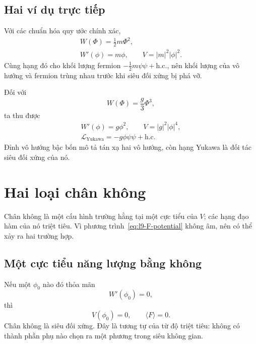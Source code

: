 \subsection{Hai ví dụ trực tiếp}

Với các chuẩn hóa quy ước chính xác,
\begin{equation}
\begin{gathered}
W(\Phi)=\frac12m\Phi^2,\\
W'(\phi)=m\phi,
\qquad V=|m|^2|\phi|^2.
\end{gathered}
\label{eq:l9-quadratic-W}
\end{equation}
Cùng hạng đó cho khối lượng fermion \(-\tfrac12m\psi\psi+\mathrm{h.c.}\), nên khối lượng của vô hướng và fermion trùng nhau trước khi siêu đối xứng bị phá vỡ.

Đối với
\begin{equation}
W(\Phi)=\frac{g}{3}\Phi^3,
\end{equation}
ta thu được
\begin{equation}
\begin{gathered}
W'(\phi)=g\phi^2,
\qquad V=|g|^2|\phi|^4,\\
\mathcal L_{\mathrm{Yukawa}}
=-g\phi\psi\psi+\mathrm{h.c.}
\end{gathered}
\label{eq:l9-cubic-W}
\end{equation}
Đỉnh vô hướng bậc bốn mô tả tán xạ hai vô hướng, còn hạng Yukawa là đối tác siêu đối xứng của nó.

\section{Hai loại chân không}

Chân không là một cấu hình trường hằng tại một cực tiểu của \(V\); các hạng đạo hàm của nó triệt tiêu. Vì phương trình~\eqref{eq:l9-F-potential} không âm, nên có thể xảy ra hai trường hợp.

\subsection{Một cực tiểu năng lượng bằng không}

Nếu một \(\phi_0\) nào đó thỏa mãn
\begin{equation}
W'(\phi_0)=0,
\end{equation}
thì
\begin{equation}
V(\phi_0)=0,
\qquad
\langle F\rangle=0.
\label{eq:l9-unbroken-F}
\end{equation}
Chân không là siêu đối xứng. Đây là tương tự của từ độ triệt tiêu: không có thành phần phụ nào chọn ra một phương trong siêu không gian.

